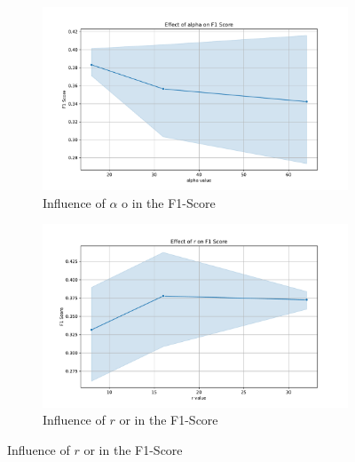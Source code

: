 \documentclass[fleqn,moreauthors,10pt]{ds_report}
\begin{document}
\begin{figure}[ht!]
\centering

\begin{subfigure}[b]{0.89\linewidth} %
    \centering
    \includegraphics[width=\textwidth]{alpha_on_F1_Score.pdf}
    \caption{Influence of $\alpha$ o in the F1-Score}
    \label{fig:image1}
\end{subfigure}

\begin{subfigure}[b]{0.89\linewidth}
    \centering
    \includegraphics[width=\textwidth]{fig/r_on_F1_Score.pdf}
    \caption{Influence of $r$ or in the F1-Score}
    \label{fig:image2}
\end{subfigure}


\end{figure}
\end{document}
